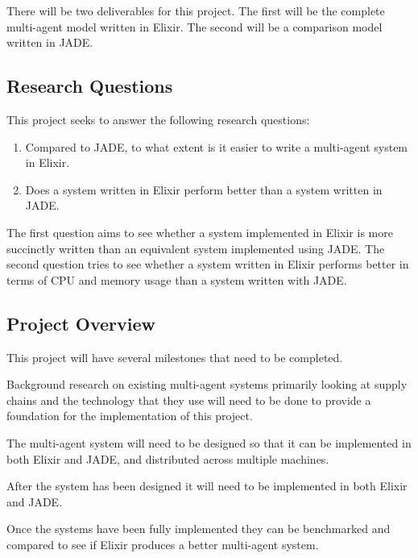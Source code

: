 There will be two deliverables for this project.
The first will be the complete multi-agent model written in Elixir.
The second will be a comparison model written in JADE\@.

\subsection{Research Questions}

This project seeks to answer the following research questions:

\begin{enumerate}
    \item Compared to JADE, to what extent is it easier to write a multi-agent system in Elixir.
    \item Does a system written in Elixir perform better than a system written in JADE\@.
\end{enumerate}

The first question aims to see whether a system implemented in Elixir is more succinctly written than an equivalent system implemented using JADE\@.
The second question tries to see whether a system written in Elixir performs better in terms of CPU and memory usage than a system written with JADE\@.

\subsection{Project Overview}

This project will have several milestones that need to be completed.

\begin{description}[style=nextline]
    \item [Literature Review] Background research on existing multi-agent systems primarily looking at supply chains and the technology that they use will need to be done to provide a foundation for the implementation of this project.
    \item [System Design] The multi-agent system will need to be designed so that it can be implemented in both Elixir and JADE, and distributed across multiple machines\@.
    \item [Implementation] After the system has been designed it will need to be implemented in both Elixir and JADE\@.
    \item [Analysis] Once the systems have been fully implemented they can be benchmarked and compared to see if Elixir produces a better multi-agent system.
\end{description}
